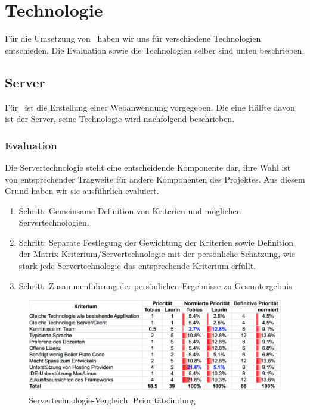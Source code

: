 \section{Technologie}\label{architektur.technologie}
	Für die Umsetzung von \eeppi\ haben wir uns für verschiedene Technologien entschieden.
	Die Evaluation sowie die Technologien selber sind unten beschrieben.

	\subsection{Server}
		Für \eeppi\ ist die Erstellung einer Webanwendung vorgegeben.
		Die eine Hälfte davon ist der Server, seine Technologie wird nachfolgend beschrieben.

		\subsubsection{Evaluation}\label{serverEvaluation}
			Die Servertechnologie stellt eine entscheidende Komponente dar, 
			ihre Wahl ist von entsprechender Tragweite für andere Komponenten des Projektes.
			Aus diesem Grund haben wir sie ausführlich evaluiert.
			
			\begin{enumerate}
				\item Schritt: Gemeinsame Definition von Kriterien und möglichen Servertechnologien.
				\item Schritt: Separate Festlegung der Gewichtung der Kriterien sowie Definition der Matrix Kriterium/Servertechnologie mit der persönliche Schätzung, wie stark jede Servertechnologie das entsprechende Kriterium erfüllt.
				\item Schritt: Zusammenführung der persönlichen Ergebnisse zu Gesamtergebnis
			\end{enumerate}
		
			\begin{figure}[H]
				\begin{minipage}[b]{\linewidth}
					\includegraphics[width=\textwidth]{media/spreadsheets/ServertechnologieVergleichPrioritaetsfinding.pdf}
					\centering
					\caption{Servertechnologie-Vergleich: Prioritätsfindung}
					\label{fig:ServertechnologieVergleichPrioritaetsfinding}
				\end{minipage}
			\end{figure}
			
